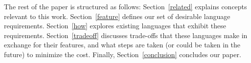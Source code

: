 The rest of the paper is structured as follows:
Section~\ref{related} explains concepts relevant to this work. Section~\ref{feature} defines our set of desirable language requirements. Section~\ref{how} explores existing languages that exhibit these requirements. Section~\ref{tradeoff} discusses trade-offs that these languages make in exchange for their features, and what steps are taken (or could be taken in the future) to minimize the cost. 
Finally, Section~\ref{conclusion} concludes our paper.